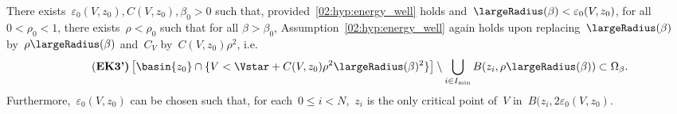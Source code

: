             \begin{proposition}
                \label{02:prop:suff_condition_delta}
                There exists~$\varepsilon_0(V,z_0),C(V,z_0),\beta_0>0$ such that, provided~\eqref{02:hyp:energy_well} holds and~$\largeRadius(\beta)<\varepsilon_0(V,z_0)$, for all~$0<\rho_0<1$, there exists~$\rho<\rho_0$ such that for all $\beta>\beta_0$, Assumption~\eqref{02:hyp:energy_well} again holds upon replacing~$\largeRadius(\beta)$ by~$\rho\largeRadius(\beta)$ and~$C_V$ by~$C(V,z_0)\rho^2$, i.e.
                \begin{equation}
                    \tag{\bf EK3'}
                    \label{02:hyp:energy_well_bis}
                    \left[\basin{z_0}\cap\{V<\Vstar+C(V,z_0)\rho^2\largeRadius(\beta)^2\}\right]\setminus \bigcup_{i\in I_{\min}} B(z_i,\rho\largeRadius(\beta)) \subset \Omega_\beta.
                \end{equation}
                Furthermore,~$\varepsilon_0(V,z_0)$ can be chosen such that, for each~$0\leq i < N$,~$z_i$ is the only critical point of~$V$ in~$B(z_i,2\varepsilon_0(V,z_0)$.
            \end{proposition}
